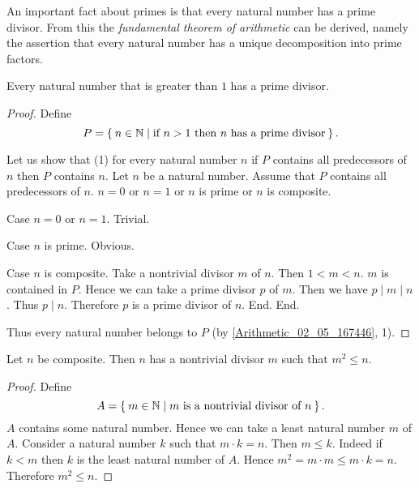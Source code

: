 \documentclass[../../arithmetic.ftl.tex]{subfiles}
\begin{document}
  \noindent An important fact about primes is that every natural number has a
  prime divisor. From this the \textit{fundamental theorem of arithmetic}
  can be derived, namely the assertion that every natural number has a unique
  decomposition into prime factors.

  \begin{forthel}
    \begin{proposition}\label{Arithmetic_03_04_130748}
      Every natural number that is greater than $1$ has a prime divisor.
    \end{proposition}
    \begin{proof}
      Define \[ P = \Set{n \in \mathbb{N} | \text{if $n > 1$ then $n$ has a prime divisor}}. \]

      Let us show that (1) for every natural number $n$ if $P$ contains all predecessors of $n$ then $P$ contains $n$.
        Let $n$ be a natural number.
        Assume that $P$ contains all predecessors of $n$.
        $n = 0$ or $n = 1$ or $n$ is prime or $n$ is composite.

        Case $n = 0$ or $n = 1$. Trivial.

        Case $n$ is prime. Obvious.

        Case $n$ is composite.
          Take a nontrivial divisor $m$ of $n$.
          Then $1 < m < n$.
          $m$ is contained in $P$.
          Hence we can take a prime divisor $p$ of $m$.
          Then we have $p \mid m \mid n$.
          Thus $p \mid n$.
          Therefore $p$ is a prime divisor of $n$.
        End.
      End.

      Thus every natural number belongs to $P$ (by \ref{Arithmetic_02_05_167446}, 1).
    \end{proof}

    \begin{proposition}\label{Arithmetic_03_04_306779}
      Let $n$ be composite.
      Then $n$ has a nontrivial divisor $m$ such that $m^{2} \leq n$.
    \end{proposition}
    \begin{proof}
      Define \[ A = \Set{m \in \mathbb{N} | \text{$m$ is a nontrivial divisor of $n$}}. \]
      $A$ contains some natural number.
      Hence we can take a least natural number $m$ of $A$.
      Consider a natural number $k$ such that $m \cdot k = n$.
      Then $m \leq k$.
      Indeed if $k < m$ then $k$ is the least natural number of $A$.
      Hence $m^{2} = m \cdot m \leq m \cdot k = n$.
      Therefore $m^{2} \leq n$.
    \end{proof}
  \end{forthel}
\end{document}
